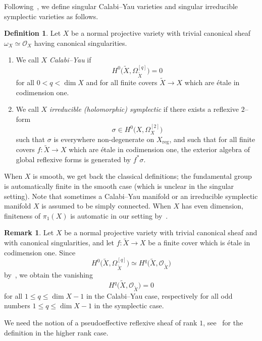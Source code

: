 \documentclass[11pt]{article}
\theoremstyle{definition}
\newtheorem{defi}[theo]{Definition}
\newtheorem{rema}[theo]{Remark}
\numberwithin{equation}{section}
\numberwithin{figure}{section}
\numberwithin{table}{section}
\DeclareMathOperator{\reg}{reg}
\newcommand\sO{\mathcal{O}}
\newcommand{\OO}{\mathcal{O}}
\newcommand*{\alphenumi}{\renewcommand*{\theenumi}{\alph{enumi}}}
\begin{document}
Following~\cite{GKP16}, we define singular Calabi--Yau varieties and singular irreducible symplectic varieties as follows.

\begin{defi}\label{def:CYSympl}
Let $X$ be a normal projective variety with trivial canonical sheaf $\omega_X \simeq \sO_X$ having canonical singularities.
\begin{enumerate}\alphenumi
\item \label{list-2.2.1}We call $X$ \emph{Calabi--Yau} if
\[
H^0 \big(\widetilde X, \Omega_{\widetilde X}^{[q]} \big) = 0
\]
for all $0 < q < \dim X$ and for all finite covers $\widetilde X \to X$ which are étale in codimension one.
\item \label{list-2.2.2}We call $X$ \emph{irreducible (holomorphic) symplectic} if there exists a reflexive $2$--form
\[
\sigma \in H^0\big(X, \Omega_{X}^{[2]} \big)
\]
such that $\sigma$ is everywhere non-degenerate on $X_{\reg}$, and such that for all finite covers $f\colon \widetilde X \to X$ which are étale in codimension one, the exterior algebra of global reflexive forms is generated by $f^*\sigma$.
\end{enumerate}
\end{defi}

When $X$ is smooth, we get back the classical definitions; the fundamental group is automatically finite in the smooth case (which is unclear in the singular setting). Note that sometimes a Calabi--Yau manifold or an irreducible symplectic manifold $X$ is assumed to be simply connected. When $X$ has even dimension, finiteness of $\pi_1(X)$ is automatic in our setting by~\cite[Proposition~8.23]{GKP16}.

\begin{rema}\label{rem4}
Let $X$ be a normal projective variety with trivial canonical sheaf and with canonical singularities, and let $f\colon \widetilde X \to X$ be a finite cover which is étale in codimension one. Since
\[
H^0\big(\widetilde X,\Omega^{[q]}_{\widetilde X}\big) \simeq H^q\big(\widetilde X,\OO_{\widetilde X}\big)
\]
by~\cite[Proposition~6.9]{GKP16}, we obtain the vanishing
\[
H^q\big(\widetilde X,\OO_{\widetilde X}\big) = 0
\]
for all $1 \leq q \leq \dim X-1$ in the Calabi--Yau case, respectively for all odd numbers $1 \leq q \leq \dim X-1$ in the symplectic case.
\end{rema}


We need the notion of a pseudoeffective reflexive sheaf of rank $1$, see~\cite[Definition~2.1]{HP17} for the definition in the higher rank case.
\end{document}
